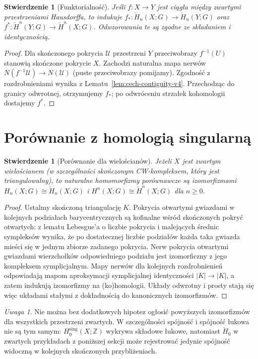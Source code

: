 \documentclass[11pt,a4paper,oneside]{report}
\newcommand{\Z}{\mathbb{Z}}
\theoremstyle{plain}
\newtheorem{stwierdzenie}[twierdzenie]{Stwierdzenie}
\theoremstyle{definition}
\theoremstyle{remark}
\newtheorem{uwaga}[twierdzenie]{Uwaga}
\begin{document}
\begin{stwierdzenie}[Funktorialność]
Jeśli $f:X\to Y$ jest ciągła między zwartymi przestrzeniami
Hausdorffa, to indukuje
$f_*:\check H_n(X;G)\to\check H_n(Y;G)$
oraz $f^*:\check H^n(Y;G)\to\check H^n(X;G)$.
Odwzorowania te są zgodne ze składaniem i identycznością.
\end{stwierdzenie}
\begin{proof}
Dla skończonego pokrycia $\mathcal U$ przestrzeni $Y$
przeciwobrazy $f^{-1}(U)$ stanowią skończone pokrycie $X$.
Zachodzi naturalna mapa nerwów
$N(f^{-1}\mathcal U)\to N(\mathcal U)$ (puste przeciwobrazy
pomijamy). Zgodność z rozdrobnieniami wynika z
Lematu~\ref{lem:cech-contiguity-v4}. Przechodząc do granicy
odwrotnej, otrzymujemy $f_*$; po odwróceniu strzałek
kohomologii dostajemy $f^*$.
\end{proof}

\section{Porównanie z homologią singularną}
\begin{stwierdzenie}[Porównanie dla wielościanów]
\label{prop:cech-poly-v4}
Jeżeli $X$ jest zwartym wielościanem (w szczególności
skończonym CW-kompleksem, który jest triangulowalny), to
naturalne homomorfizmy porównawcze są izomorfizmami
$H_n(X;G)\cong\check H_n(X;G)$ i
$H^n(X;G)\cong\check H^n(X;G)$ dla $n\ge0$.
\end{stwierdzenie}
\begin{proof}
Ustalmy skończoną triangulację $K$. Pokrycia otwartymi
gwiazdami w kolejnych podziałach barycentrycznych są
kofinalne wśród skończonych pokryć otwartych: z lematu
Lebesgue'a o liczbie pokrycia i malejących średnic sympleksów
wynika, że po dostatecznej liczbie podziałów każda taka
gwiazda mieści się w jednym zbiorze zadanego pokrycia.
Nerw pokrycia otwartymi gwiazdami wierzchołków odpowiedniego
podziału jest izomorficzny z jego kompleksem symplicjalnym.
Mapy nerwów dla kolejnych rozdrobnienień odpowiadają
mapom aproksymacji symplicjalnej identyczności $|K|\to|K|$,
a zatem indukują izomorfizmy na (ko)homologii.
Układy odwrotny i prosty stają się więc układami
stałymi z dokładnością do kanonicznych izomorfizmów.
\end{proof}

\begin{uwaga}
Nie można bez dodatkowych hipotez ogłosić powyższych
izomorfizmów dla wszystkich przestrzeni zwartych.
W szczególności spójność i spójność łukowa nie są tym samym:
$H_0^{\mathrm{sing}}(X;\Z)$ wykrywa składowe łukowe,
natomiast $\check H_0$ w zwartych przykładach z poniższej
sekcji może rejestrować jedynie spójność widoczną w
kolejnych skończonych przybliżeniach.
\end{uwaga}
\end{document}

